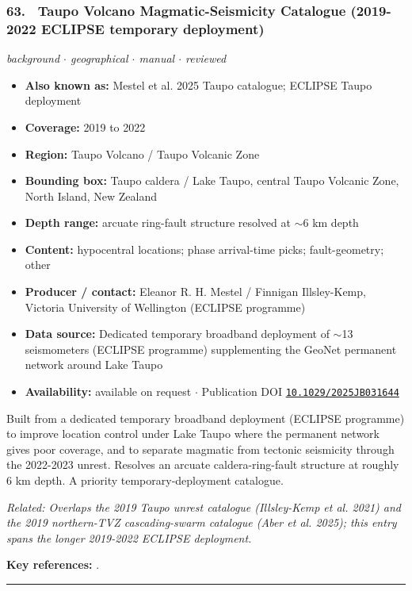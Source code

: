 \documentclass[10pt,a4paper]{article}
\newcommand{\catentryrule}{\par\vspace{3pt}\noindent\textcolor{rulegrey}{\rule{\linewidth}{0.3pt}}\par\vspace{5pt}}
\newcommand{\kv}[2]{\item \textbf{#1:} #2}
\begin{document}
\subsubsection*{\hypertarget{c:63}{63.}~ Taupo Volcano Magmatic-Seismicity Catalogue (2019-2022 ECLIPSE temporary deployment)}
{\small\itshape background $\cdot$ geographical $\cdot$ manual $\cdot$ reviewed}\par\vspace{2pt}
\begin{itemize}[leftmargin=1.3em,itemsep=0.6pt,topsep=1pt,parsep=0pt]
\kv{Also known as}{Mestel et al. 2025 Taupo catalogue; ECLIPSE Taupo deployment}
\kv{Coverage}{2019 to 2022}
\kv{Region}{Taupo Volcano / Taupo Volcanic Zone}
\kv{Bounding box}{Taupo caldera / Lake Taupo, central Taupo Volcanic Zone, North Island, New Zealand}
\kv{Depth range}{arcuate ring-fault structure resolved at $\sim$6 km depth}
\kv{Content}{hypocentral locations; phase arrival-time picks; fault-geometry; other}
\kv{Producer / contact}{Eleanor R. H. Mestel / Finnigan Illsley-Kemp, Victoria University of Wellington (ECLIPSE programme)}
\kv{Data source}{Dedicated temporary broadband deployment of $\sim$13 seismometers (ECLIPSE programme) supplementing the GeoNet permanent network around Lake Taupo}
\kv{Availability}{available on request $\cdot$ Publication DOI \href{https://doi.org/10.1029/2025JB031644}{\nolinkurl{10.1029/2025JB031644}}}
\end{itemize}
\par\vspace{2pt}Built from a dedicated temporary broadband deployment (ECLIPSE programme) to improve location control under Lake Taupo where the permanent network gives poor coverage, and to separate magmatic from tectonic seismicity through the 2022-2023 unrest. Resolves an arcuate caldera-ring-fault structure at roughly 6 km depth. A priority temporary-deployment catalogue.
\par{\small\itshape Related: Overlaps the 2019 Taupo unrest catalogue (Illsley-Kemp et al. 2021) and the 2019 northern-TVZ cascading-swarm catalogue (Aber et al. 2025); this entry spans the longer 2019-2022 ECLIPSE deployment.}
\par\vspace{2pt}\textbf{Key references:} \cite{Mestel2025}.
\catentryrule
\end{document}

